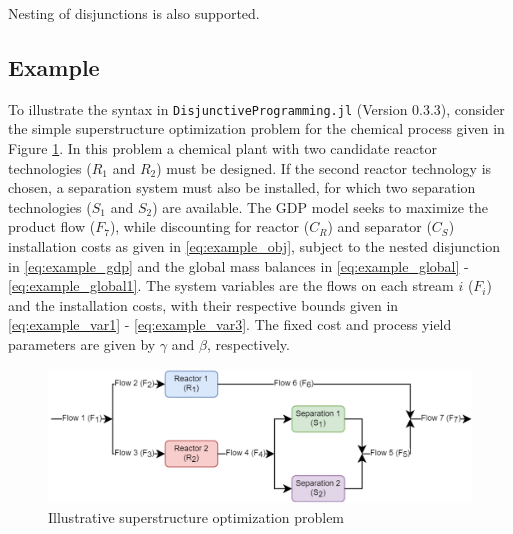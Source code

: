 \documentclass{juliacon}
\begin{document}
\vskip 6pt
Nesting of disjunctions is also supported.

\subsection{Example}
To illustrate the syntax in \verb|DisjunctiveProgramming.jl| (Version 0.3.3), consider the simple superstructure optimization problem for the chemical process given in Figure \ref{fig:superstruct_opt_diagram}. In this problem a chemical plant with two candidate reactor technologies ($R_1$ and $R_2$) must be designed. If the second reactor technology is chosen, a separation system must also be installed, for which two separation technologies ($S_1$ and $S_2$) are available. The GDP model seeks to maximize the product flow ($F_7$), while discounting for reactor ($C_R$) and separator ($C_S$) installation costs as given in \eqref{eq:example_obj}, subject to the nested disjunction in \eqref{eq:example_gdp} and the global mass balances in \eqref{eq:example_global}
- \eqref{eq:example_global1}. The system variables are the flows on each stream $i$ ($F_i$) and the installation costs, with their respective bounds given in \eqref{eq:example_var1} - \eqref{eq:example_var3}. The fixed cost and process yield parameters are given by $\gamma$ and $\beta$, respectively.

\begin{figure}
    \centering
    \includegraphics[scale=0.4]{superstructure_pfd.png}
    \caption{Illustrative superstructure optimization problem}
    \label{fig:superstruct_opt_diagram}
\end{figure}
\end{document}
